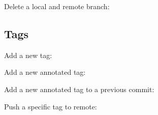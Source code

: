 \begin{flushleft}
\end{flushleft}
\vspace{-0.4cm}
\begin{flushleft}
\end{flushleft}

\begin{flushleft}
	Delete a local and remote branch:
\end{flushleft}

\begin{flushleft}
\end{flushleft}
\vspace{-0.4cm}
\begin{flushleft}
\end{flushleft}


\subsection{Tags}\label{git-tag}

\begin{flushleft}
	Add a new tag:
\end{flushleft}

\begin{flushleft}
\end{flushleft}

\begin{flushleft}
	Add a new annotated tag:
\end{flushleft}

\begin{flushleft}
\end{flushleft}

\begin{flushleft}
	Add a new annotated tag to a previous commit:
\end{flushleft}

\begin{flushleft}
\end{flushleft}

\begin{flushleft}
	Push a specific tag to remote:
\end{flushleft}

